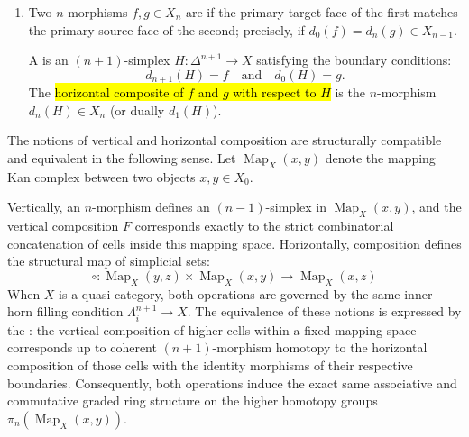 \begin{definition}
\begin{enumerate}
\begin{enumerate}
            \item Two $n$-morphisms $f, g \in X_n$ are  if the primary target face of the first matches the primary source face of the second; precisely, if $d_0(f) = d_n(g) \in X_{n-1}$. 
            
            A  is an $(n+1)$-simplex $H: \Delta^{n+1} \to X$ satisfying the boundary conditions:
            $$d_{n+1}(H) = f \quad \text{and} \quad d_0(H) = g.$$
            The \hl{horizontal composite of $f$ and $g$ with respect to $H$} is the $n$-morphism $d_n(H) \in X_n$ (or dually $d_1(H)$).
        \end{enumerate}

        The notions of vertical and horizontal composition are structurally compatible and equivalent in the following sense. Let $\operatorname{Map}_X(x,y)$ denote the mapping Kan complex between two objects $x,y \in X_0$. 
        
        Vertically, an $n$-morphism defines an $(n-1)$-simplex in $\operatorname{Map}_X(x,y)$, and the vertical composition $F$ corresponds exactly to the strict combinatorial concatenation of cells inside this mapping space. Horizontally, composition defines the structural map of simplicial sets:
        $$\circ: \operatorname{Map}_X(y,z) \times \operatorname{Map}_X(x,y) \to \operatorname{Map}_X(x,z)$$
        When $X$ is a quasi-category, both operations are governed by the same inner horn filling condition $\Lambda^{n+1}_i \to X$. The equivalence of these notions is expressed by the : the vertical composition of higher cells within a fixed mapping space corresponds up to coherent $(n+1)$-morphism homotopy to the horizontal composition of those cells with the identity morphisms of their respective boundaries. Consequently, both operations induce the exact same associative and commutative graded ring structure on the higher homotopy groups $\pi_n(\operatorname{Map}_X(x,y))$.

    \end{enumerate}
\end{definition}